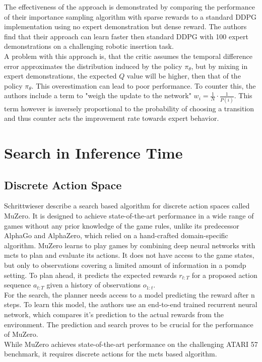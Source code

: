 The effectiveness of the approach is demonstrated by comparing the performance of their importance sampling algorithm with sparse rewards to a standard DDPG 
implementation using no expert demonstration but dense reward. The authors find that their approach can learn faster then standard DDPG with 100 expert 
demonstrations on a challenging robotic insertion task.\\ 
A problem with this approach is, that the critic assumes the temporal difference error approximates the distribution induced by the policy $\pi_{\theta}$, but by 
mixing in expert demonstrations, the expected $Q$ value will be higher, then that of the policy $\pi_{\theta}$. This overestimation can lead to poor performance. 
To counter this, the authors include a term to "weigh the update to the network" $w_i = \frac{1}{N} \cdot \frac{1}{P(i)}$. This term however is inversely proportional to the 
probability of choosing a transition and thus counter acts the improvement rate towards expert behavior. 

\section{Search in Inference Time}
\subsection{Discrete Action Space}

Schrittwieser \etAl \cite{MUZero} describe a search based algorithm for discrete action spaces called MuZero. It is designed to achieve state-of-the-art performance 
in a wide range of games without any prior knowledge of the game rules, unlike its predecessor AlphaGo and AlphaZero, which relied on a hand-crafted 
domain-specific algorithm. MuZero learns to play games by combining deep neural networks with \ac{mcts} to plan and evaluate its actions. 
It does not have access to the game states, but only to observations covering a limited amount of information in a \ac{pomdp} setting.
To plan ahead, it predicts the expected rewards $r_{t:T}$ for a proposed action sequence $a_{t:T}$ given a history of observations $o_{1:t}$.\\
For the search, the planner needs access to a model predicting the reward after n steps. To learn this model, the authors use an end-to-end trained recurrent neural network, which 
compares it's prediction to the actual rewards from the environment. The prediction and search proves to be crucial for the performance of MuZero.\\ 
While MuZero achieves state-of-the-art performance on the challenging ATARI 57 benchmark, it requires discrete actions for the \ac{mcts} based algorithm.

